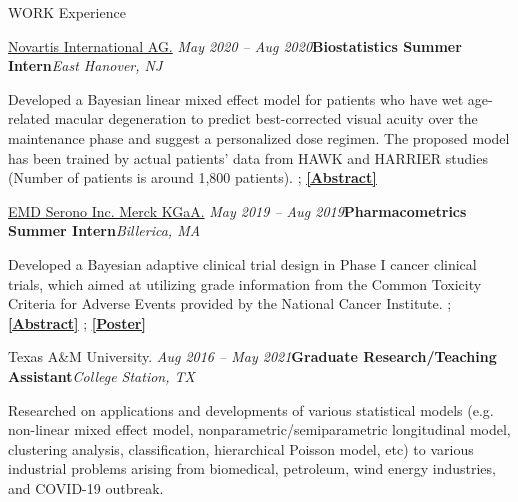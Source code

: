 \documentclass[
	11pt, %
]{resume} %
\begin{document}
\begin{rSection}{WORK Experience}
\begin{rSubsection}{
\href{https://www.pharma.us.novartis.com/}{Novartis International AG.}
}{\em May 2020 -- Aug 2020}{\textbf{Biostatistics Summer Intern}}{\em East Hanover, NJ}
\item 
Developed a Bayesian linear mixed effect model for patients who have wet age-related macular degeneration to predict best-corrected visual acuity over the maintenance phase and suggest a personalized dose regimen. The proposed model has been trained by actual patients' data from HAWK and HARRIER studies (Number of patients is around 1,800 patients). ; \href{https://sites.google.com/view/seyoonlee/home/projects/novartis-summer-internship-project?authuser=0#h.dfc3zhswkx8m}
{\underline{\textbf{[Abstract]}}}
\end{rSubsection}



\begin{rSubsection}{
\href{https://www.emdserono.com/us-en}{EMD Serono Inc. Merck KGaA.}
}{\em May 2019 -- Aug 2019}{\textbf{Pharmacometrics Summer Intern}}{\em Billerica, MA}
\item 
Developed a Bayesian adaptive clinical trial design in Phase I cancer clinical trials, which aimed at utilizing grade information from the Common Toxicity Criteria for Adverse Events provided by the National Cancer Institute. ; 
\href{https://sites.google.com/view/seyoonlee/home/projects/merck-group-summer-internship-project?authuser=0#h.lnkjghpa5ikt}
{\underline{\textbf{[Abstract]}}}
;
\href{https://www.dropbox.com/s/dnlynbzl6ojmgwh/ACOP_Se_Yoon_Lee_PhD.pdf?dl=0}
{\underline{\textbf{[Poster]}}}
\end{rSubsection}


\begin{rSubsection}{Texas A\&M University.
}{\em Aug 2016 -- May 2021}{\textbf{Graduate Research/Teaching Assistant}}{\em College Station, TX}
\item 
Researched on applications and developments of various statistical models (e.g. non-linear mixed effect model, nonparametric/semiparametric longitudinal model, clustering analysis, classification, hierarchical Poisson model, etc) to various industrial problems arising from biomedical, petroleum, wind energy industries, and COVID-19 outbreak.
\end{rSubsection}


\end{rSection}
\end{document}
